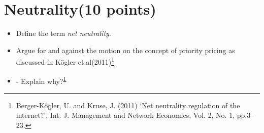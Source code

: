 \documentclass{WeSTassignment}
\begin{document}

\section{Neutrality(10 points)}

\begin{itemize}
\item Define the term \emph{net neutrality}.
\item Argue for and against the motion on the concept of priority pricing as discussed in Kögler et.al(2011)\footnote{\label{note1}Berger-Kögler, U. and Kruse, J. (2011) ‘Net neutrality regulation of the internet?’, Int. J. Management and Network Economics, Vol. 2, No. 1, pp.3–23.}
\item - Explain why?\textsuperscript{\ref{note1}}

\end{itemize}





\makefooter
\end{document}
